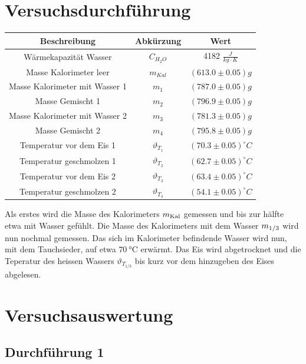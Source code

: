 \documentclass[a4paper,12pt]{article}
\begin{document}
\section{Versuchsdurchführung}
\begin{table}[H]
    \centering
    \begin{tabular}{|c|c|c|}
        \hline
        \textbf{Beschreibung} & \textbf{Abkürzung} & \textbf{Wert} \\
        \hline
        Wärmekapazität Wasser & $C_{H_{2}O}$ & 4182 $\frac{J}{kg\cdot{}K}$\\
        \hline
        Masse Kalorimeter leer & $m_{Kal}$ & $(613.0\pm 0.05)g$\\
        Masse Kalorimeter mit Wasser 1 & $m_{1}$ & $(787.0\pm 0.05)g$\\
        \hline
        Masse Gemischt 1 & $m_{2}$ & $(796.9\pm 0.05)g$\\
        Masse Kalorimeter mit Wasser 2 & $m_{3}$ & $(781.3\pm 0.05)g$\\
    Masse Gemischt 2 & $m_{4}$ & $(795.8\pm 0.05)g$\\
        \hline
        Temperatur vor dem Eis 1 & $\vartheta_{T_{1}}$ & $(70.3\pm 0.05)^{\circ}C$\\
        Temperatur geschmolzen 1 & $\vartheta_{T_{2}}$ & $(62.7\pm 0.05) ^{\circ}C$\\
        \hline
        Temperatur vor dem Eis 2 & $\vartheta_{T_{3}}$ & $(63.4\pm 0.05)^{\circ}C$\\
        Temperatur geschmolzen 2 & $\vartheta_{T_{4}}$ & $(54.1\pm 0.05) ^{\circ}C$\\
        \hline
    \end{tabular}
\end{table}
Als erstes wird die Masse des Kalorimeters $m_{\rm{Kal}} $ gemessen  und bis zur hälfte etwa mit Wasser gefühlt. Die Masse des Kalorimeters mit dem Wasser $m_{\rm{1/3}} $ wird nun nochmal gemessen. Das sich im Kalorimeter befindende Wasser wird nun, mit dem Tauchsieder, auf etwa   $\SI{70}{\celsius} $ erwärmt. Das Eis wird abgetrocknet und die Teperatur des heissen Wassers $\vartheta_{T_{1/3}} $ bis kurz vor dem hinzugeben des Eises abgelesen. 
\section{Versuchsauswertung}

\subsection{Durchführung 1}
\end{document}
